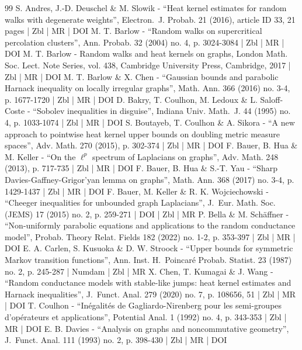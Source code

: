 \documentclass[10pt]{amsart}
\theoremstyle{plain}
\theoremstyle{definition}
\begin{document}
\begin{thebibliography}{99}
S. Andres, J.-D. Deuschel \& M. Slowik - “Heat kernel estimates for random walks with degenerate weights”, Electron. J. Probab. 21 (2016), article ID 33, 21 pages | Zbl | MR | DOI
M. T. Barlow - “Random walks on supercritical percolation clusters”, Ann. Probab. 32 (2004) no. 4, p. 3024-3084 | Zbl | MR | DOI
M. T. Barlow - Random walks and heat kernels on graphs, London Math. Soc. Lect. Note Series, vol. 438, Cambridge University Press, Cambridge, 2017 | Zbl | MR | DOI
M. T. Barlow \& X. Chen - “Gaussian bounds and parabolic Harnack inequality on locally irregular graphs”, Math. Ann. 366 (2016) no. 3-4, p. 1677-1720 | Zbl | MR | DOI
D. Bakry, T. Coulhon, M. Ledoux \& L. Saloff-Coste - “Sobolev inequalities in disguise”, Indiana Univ. Math. J. 44 (1995) no. 4, p. 1033-1074 | Zbl | MR | DOI
S. Boutayeb, T. Coulhon \& A. Sikora - “A new approach to pointwise heat kernel upper bounds on doubling metric measure spaces”, Adv. Math. 270 (2015), p. 302-374 | Zbl | MR | DOI
F. Bauer, B. Hua \& M. Keller - “On the $\ell ^p$ spectrum of Laplacians on graphs”, Adv. Math. 248 (2013), p. 717-735 | Zbl | MR | DOI
F. Bauer, B. Hua \& S.-T. Yau - “Sharp Davies-Gaffney-Grigor’yan lemma on graphs”, Math. Ann. 368 (2017) no. 3-4, p. 1429-1437 | Zbl | MR | DOI
F. Bauer, M. Keller \& R. K. Wojciechowski - “Cheeger inequalities for unbounded graph Laplacians”, J. Eur. Math. Soc. (JEMS) 17 (2015) no. 2, p. 259-271 | DOI | Zbl | MR
P. Bella \& M. Schäffner - “Non-uniformly parabolic equations and applications to the random conductance model”, Probab. Theory Relat. Fields 182 (2022) no. 1-2, p. 353-397 | Zbl | MR | DOI
E. A. Carlen, S. Kusuoka \& D. W. Stroock - “Upper bounds for symmetric Markov transition functions”, Ann. Inst. H. Poincaré Probab. Statist. 23 (1987) no. 2, p. 245-287 | Numdam | Zbl | MR
X. Chen, T. Kumagai \& J. Wang - “Random conductance models with stable-like jumps: heat kernel estimates and Harnack inequalities”, J. Funct. Anal. 279 (2020) no. 7, p. 108656, 51 | Zbl | MR | DOI
T. Coulhon - “Inégalités de Gagliardo-Nirenberg pour les semi-groupes d’opérateurs et applications”, Potential Anal. 1 (1992) no. 4, p. 343-353 | Zbl | MR | DOI
E. B. Davies - “Analysis on graphs and noncommutative geometry”, J. Funct. Anal. 111 (1993) no. 2, p. 398-430 | Zbl | MR | DOI

\end{thebibliography}
\end{document}
